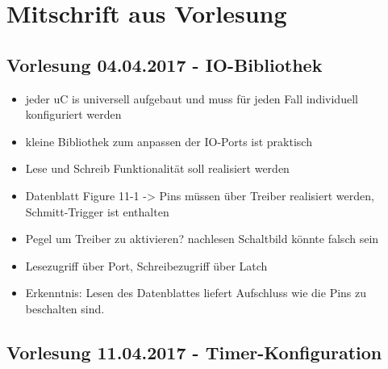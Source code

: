 \section{Mitschrift aus Vorlesung}
\subsection{Vorlesung 04.04.2017 - IO-Bibliothek}

\begin{itemize}%
		\item jeder uC is universell aufgebaut und muss für jeden Fall individuell konfiguriert werden
		\item kleine Bibliothek zum anpassen der IO-Ports ist praktisch
		\item Lese und Schreib Funktionalität soll realisiert werden
		\item Datenblatt Figure 11-1 -> Pins müssen über Treiber realisiert werden, Schmitt-Trigger ist enthalten
		\item Pegel um Treiber zu aktivieren? nachlesen Schaltbild könnte falsch sein
		\item Lesezugriff über Port, Schreibezugriff über Latch
		\item Erkenntnis: Lesen des Datenblattes liefert Aufschluss wie die Pins zu beschalten sind. 
		
\end{itemize}

\subsection{Vorlesung 11.04.2017 - Timer-Konfiguration}

